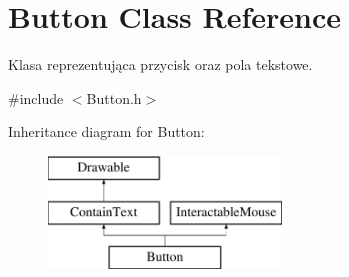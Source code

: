 \hypertarget{class_button}{}\section{Button Class Reference}
\label{class_button}


Klasa reprezentująca przycisk oraz pola tekstowe.  




{\ttfamily \#include $<$Button.\+h$>$}

Inheritance diagram for Button\+:\begin{figure}[H]
\begin{center}
\leavevmode
\includegraphics[height=3.000000cm]{class_button}
\end{center}
\end{figure}
